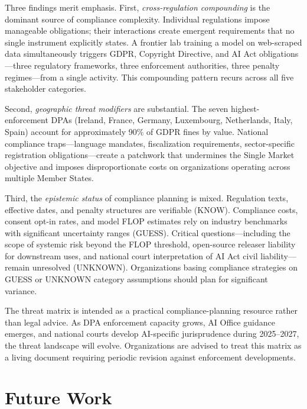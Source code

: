\documentclass[11pt,a4paper]{article}
\begin{document}
Three findings merit emphasis. First, \emph{cross-regulation compounding} is the dominant source of compliance complexity. Individual regulations impose manageable obligations; their interactions create emergent requirements that no single instrument explicitly states. A frontier lab training a model on web-scraped data simultaneously triggers GDPR, Copyright Directive, and AI Act obligations---three regulatory frameworks, three enforcement authorities, three penalty regimes---from a single activity. This compounding pattern recurs across all five stakeholder categories.

Second, \emph{geographic threat modifiers} are substantial. The seven highest-enforcement DPAs (Ireland, France, Germany, Luxembourg, Netherlands, Italy, Spain) account for approximately 90\% of GDPR fines by value. National compliance traps---language mandates, fiscalization requirements, sector-specific registration obligations---create a patchwork that undermines the Single Market objective and imposes disproportionate costs on organizations operating across multiple Member States.

Third, the \emph{epistemic status} of compliance planning is mixed. Regulation texts, effective dates, and penalty structures are verifiable (KNOW). Compliance costs, consent opt-in rates, and model FLOP estimates rely on industry benchmarks with significant uncertainty ranges (GUESS). Critical questions---including the scope of systemic risk beyond the FLOP threshold, open-source releaser liability for downstream uses, and national court interpretation of AI Act civil liability---remain unresolved (UNKNOWN). Organizations basing compliance strategies on GUESS or UNKNOWN category assumptions should plan for significant variance.

The threat matrix is intended as a practical compliance-planning resource rather than legal advice. As DPA enforcement capacity grows, AI Office guidance emerges, and national courts develop AI-specific jurisprudence during 2025--2027, the threat landscape will evolve. Organizations are advised to treat this matrix as a living document requiring periodic revision against enforcement developments.


\section{Future Work}
\label{sec:future-work}
\end{document}
